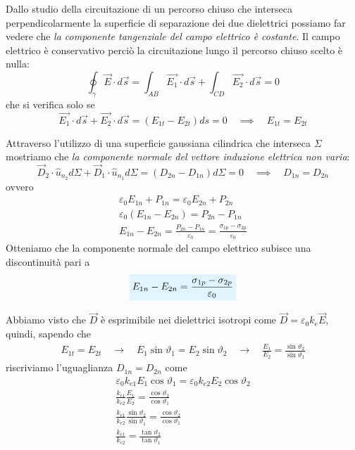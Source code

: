 \documentclass[x11names]{report}
\begin{document}
Dallo studio della circuitazione di un percorso chiuso che interseca perpendicolarmente la superficie di separazione dei due dielettrici possiamo far vedere che \textit{la componente tangenziale del campo elettrico è costante}. Il campo elettrico è conservativo perciò la circuitazione lungo il percorso chiuso scelto è nulla:
\[
\oint_\gamma \vec{E}\cdot d\vec{s} = \int_{AB} \vec{E_1}\cdot d\vec{s} + \int_{CD}  \vec{E_2}\cdot  d\vec{s} = 0
\]
che si verifica solo se
\[
\vec{E_1}\cdot  d\vec{s} + \vec{E_2}\cdot  d\vec{s} =( E_{1t}  - E_{2t})ds = 0 \quad \implies \quad  E_{1t} = E_{2t}
\]

\begin{figure}[H]
	\centering
\end{figure}

Attraverso l'utilizzo di una superficie gaussiana cilindrica che interseca \(\Sigma\) mostriamo che \textit{la componente normale del vettore induzione elettrica non varia}:
\[
\vec{D}_2 \cdot \hat{u}_{n_2} d\Sigma + \vec{D}_1 \cdot \hat{u}_{n_1} d\Sigma = (D_{2n} - D_{1n})d\Sigma = 0 \quad \implies \quad D_{1n} = D_{2n}
\]
ovvero
\begin{gather*}
	\varepsilon_0 E_{1n} + P_{1n} = \varepsilon_0 E_{2n} + P_{2n} \\
	\varepsilon_0\left(E_{1n} - E_{2n}\right) = P_{2n} - P_{1n} \\
	E_{1n} - E_{2n} = \frac{P_{2n} - P_{1n}}{\varepsilon_0} = \frac{\sigma_{1p} - \sigma_{2p}}{\varepsilon_0}
\end{gather*}
Otteniamo che la componente normale del campo elettrico subisce una discontinuità pari a 
\begin{equation}
	\viola{E_{1n} - E_{2n} = \frac{\sigma_{1p} - \sigma_{2p}}{\varepsilon_0}}
\end{equation}

Abbiamo visto che \(\vec{D}\) è esprimibile nei dielettrici isotropi come \(\vec{D} = \varepsilon_0 k_e\vec{E}\), quindi, sapendo che
\begin{gather*}
	E_{1t} = E_{2t} \quad \to \quad E_1\sin\vartheta_1 = E_2\sin\vartheta_2 \quad \to \quad \frac{E_1}{E_2} = \frac{\sin\vartheta_2}{\sin\vartheta_1} 
\end{gather*}
riscriviamo l'uguaglianza \(D_{1n} = D_{2n}\) come 
\begin{gather*}
	\varepsilon_0 k_{e1} E_1\cos\vartheta_1 = \varepsilon_0 k_{e2} E_2\cos\vartheta_2 \\
	\frac{k_{e1}}{k_{e2}}\frac{E_1}{E_2} = \frac{\cos\vartheta_2}{\cos\vartheta_1} \\
	\frac{k_{e1}}{k_{e2}}\frac{\sin\vartheta_2}{\sin\vartheta_1} = \frac{\cos\vartheta_2}{\cos\vartheta_1} \\
	\frac{k_{e1}}{k_{e2}} =\frac{\tan\vartheta_2}{\tan\vartheta_1}
\end{gather*}
\end{document}

